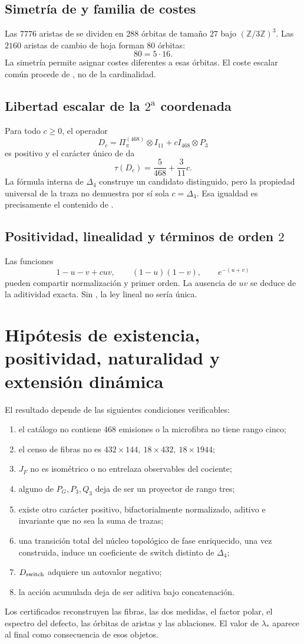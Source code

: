 \subsection{Simetría de \texorpdfstring{\Gtr}{Gamma tr} y familia de costes}

Las \(7776\) aristas de \Gtr se dividen en \(288\) órbitas de tamaño
\(27\) bajo \((\mathbb Z/3\mathbb Z)^3\). Las \(2160\) aristas de
cambio de hoja forman \(80\) órbitas:
\[
 80=5\cdot16.
\]
La simetría permite asignar costes diferentes a esas órbitas. El coste
escalar común procede de \HAdd, no de la cardinalidad.

\subsection{Libertad escalar de la \(2^{\mathrm a}\) coordenada}

Para todo \(c\ge0\), el operador
\[
D_c=\Pi_\pi^{(468)}\otimes I_{11}
+cI_{468}\otimes P_3
\]
es positivo y el carácter único de \HAdd da
\[
\tau(D_c)=\frac5{468}+\frac3{11}c.
\]
La fórmula interna de \(\Delta_4\) construye un candidato distinguido, pero
la propiedad universal de la traza no demuestra por sí sola
\(c=\Delta_4\). Esa igualdad es precisamente el contenido de \HDef.

\subsection{Positividad, linealidad y términos de orden \(2\)}

Las funciones
\[
 1-u-v+cuv,\qquad(1-u)(1-v),\qquad e^{-(u+v)}
\]
pueden compartir normalización y primer orden. La ausencia de \(uv\) se
deduce de la aditividad exacta. Sin \HAdd, la ley lineal no sería única.

\section{Hipótesis de existencia, positividad, naturalidad y extensión dinámica}

El resultado depende de las siguientes condiciones verificables:
\begin{enumerate}
  \item el catálogo no contiene \(468\) emisiones o la microfibra no tiene
  rango cinco;
  \item el censo de fibras no es
  \(432\times144,\ 18\times432,\ 18\times1944\);
  \item \(J_F\) no es isométrico o no entrelaza observables del cociente;
  \item alguno de \(P_G,P_3,Q_3\) deja de ser un proyector de rango tres;
  \item existe otro carácter positivo, bifactorialmente normalizado, aditivo e
  invariante que no sea la suma de trazas;
  \item una transición total del núcleo topológico de fase enriquecido, una vez construida, induce un
  coeficiente de switch distinto de \(\Delta_4\);
  \item \(D_{\rm switch}\) adquiere un autovalor negativo;
  \item la acción acumulada deja de ser aditiva bajo concatenación.
\end{enumerate}

Los certificados reconstruyen las fibras, las dos medidas, el factor polar,
el espectro del defecto, las órbitas de aristas y las ablaciones. El valor de
\(\lambda_*\) aparece al final como consecuencia de esos objetos.
\fi
